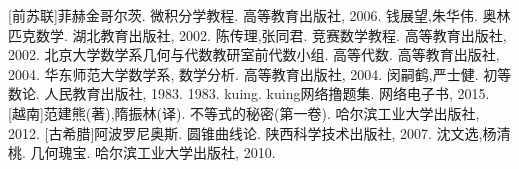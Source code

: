 
\begin{thebibliography}{99}
    [前苏联]菲赫金哥尔茨. 微积分学教程. 高等教育出版社, 2006.
    钱展望,朱华伟. 奥林匹克数学. 湖北教育出版社, 2002.
    陈传理,张同君. 竞赛数学教程. 高等教育出版社, 2002.
    北京大学数学系几何与代数教研室前代数小组. 高等代数. 高等教育出版社, 2004.
    华东师范大学数学系, 数学分析. 高等教育出版社, 2004.
    闵嗣鹤,严士健. 初等数论. 人民教育出版社, 1983. 1983.
    kuing. kuing网络撸题集. 网络电子书, 2015.
   [越南]范建熊(著),隋振林(译). 不等式的秘密(第一卷). 哈尔滨工业大学出版社, 2012.
   [古希腊]阿波罗尼奥斯. 圆锥曲线论. 陕西科学技术出版社, 2007.
   沈文选,杨清桃. 几何瑰宝. 哈尔滨工业大学出版社, 2010.
\end{thebibliography}



